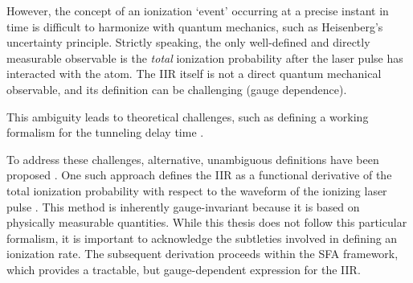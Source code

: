 However, the concept of an ionization `event' occurring at a precise instant in time is difficult to harmonize with quantum mechanics, such as Heisenberg's uncertainty principle. 
Strictly speaking, the only well-defined and directly measurable observable is the \emph{total} ionization probability after the laser pulse has interacted with the atom. 
The IIR itself is not a direct quantum mechanical observable, and its definition can be challenging (gauge dependence).

This ambiguity leads to theoretical challenges, such as defining a working formalism for the tunneling delay time \cite{Ivanov2018}.

To address these challenges, alternative, unambiguous definitions have been proposed \cite{agarwal2025generalapproximatorstrongfieldionization}. One such approach defines the IIR as a functional derivative of the total ionization probability with respect to the waveform of the ionizing laser pulse \cite{Ivanov2018}. 
This method is inherently gauge-invariant because it is based on physically measurable quantities. 
While this thesis does not follow this particular formalism, it is important to acknowledge the subtleties involved in defining an ionization rate. 
The subsequent derivation proceeds within the SFA framework, which provides a tractable, but gauge-dependent expression for the IIR.



